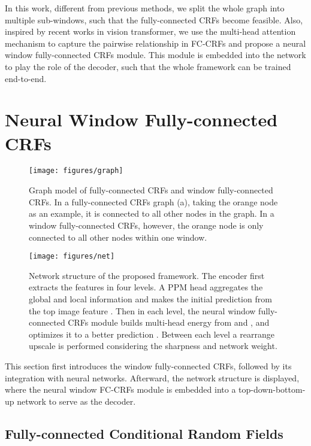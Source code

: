 \documentclass[10pt,twocolumn,letterpaper]{article}
\begin{document}
In this work, different from previous methods, we split the whole graph into multiple sub-windows, such that the fully-connected CRFs become feasible.
Also, inspired by recent works in vision transformer\cite{vaswani2017attention, dosovitskiy2020image, liu2021swin},
we use the multi-head attention mechanism to capture the pairwise relationship in FC-CRFs and propose a neural window fully-connected CRFs module.
This module is embedded into the network to play the role of the decoder, such that the whole framework can be trained end-to-end.
 \section{Neural Window Fully-connected CRFs}
\label{sec:method}

\begin{figure}[t]
\centering
  \texttt{[image: figures/graph]}
\caption{Graph model of fully-connected CRFs and window fully-connected CRFs. In a fully-connected CRFs graph (a), taking the orange node as an example, it is connected to all other nodes in the graph. In a window fully-connected CRFs, however, the orange node is only connected to all other nodes within one window.}
\label{fig:graph}
\vspace{-3mm}
\end{figure}


\begin{figure*}[t]
\centering
  \texttt{[image: figures/net]}
\caption{Network structure of the proposed framework. The encoder first extracts the features in four levels.
A PPM head aggregates the global and local information and makes the initial prediction  from the top image feature . Then in each level, the neural window fully-connected CRFs module builds multi-head energy from  and , and optimizes it to a better prediction . Between each level a rearrange upscale is performed considering the sharpness and network weight.}
\label{fig:net}
\vspace{-2mm}
\end{figure*}

This section first introduces the window fully-connected CRFs, followed by its integration with neural networks. 
Afterward, the network structure is displayed, where the neural window FC-CRFs module is embedded into a top-down-bottom-up network to serve as the decoder.


\subsection{Fully-connected Conditional Random Fields}
\end{document}
